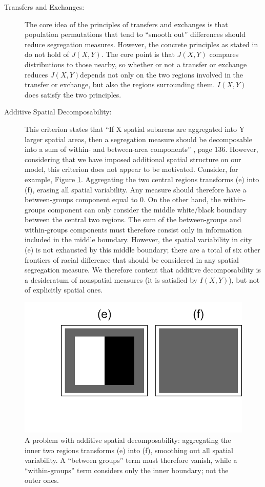\begin{description}
		\item[Transfers and Exchanges:] The core idea of the principles of transfers and exchanges is that population permutations that tend to ``smooth out'' differences should reduce segregation measures. However, the concrete principles as stated in \cite{Reardon2002} do not hold of $J(X,Y)$. The core point is that $J(X,Y)$ compares distributions to those nearby, so whether or not a transfer or exchange reduces $J(X,Y)$depends not only on the two regions involved in the transfer or exchange, but also the regions surrounding them. $I(X,Y)$ does satisfy the two principles. %
		\item[Additive Spatial Decomposability:] This criterion states that ``If X spatial subareas are aggregated into Y larger spatial areas, then a segregation measure should be decomposable into a sum of within- and between-area components'' \cite{Reardon2004}, page 136. However, considering that we have imposed additional spatial structure on our model, this criterion does not appear to be motivated. Consider, for example, Figure \ref{fig:decomposability}. Aggregating the two central regions transforms (e) into (f), erasing all spatial variability. Any measure should therefore have a between-groups component equal to 0. On the other hand, the within-groups component can only consider the middle white/black boundary between the central two regions. The sum of the between-groups and within-groups components must therefore consist only in information included in the middle boundary. However, the spatial variability in city (e) is not exhausted by this middle boundary; there are a total of six other frontiers of racial difference that should be considered in any spatial segregation measure. We therefore content that additive decomposability is a desideratum of nonspatial measures (it is satisfied by $I(X,Y)$), but not of explicitly spatial ones. 
	\end{description}
	

	\begin{figure}
		\centering
		\includegraphics[width=.5\textwidth]{figs/decomposability.png}
		\caption{A problem with additive spatial decomposability: aggregating the inner two regions transforms (e) into (f), smoothing out all spatial variability. A ``between groups'' term must therefore vanish, while a ``within-groups'' term considers only the inner boundary; not the outer ones.}
		\label{fig:decomposability}
	\end{figure}
	
